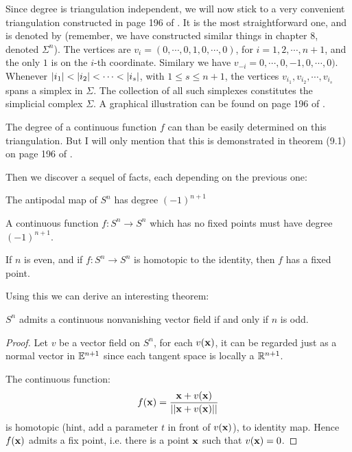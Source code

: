 Since degree is triangulation independent, we will now stick to a very
convenient triangulation constructed in page 196 of \cite{book}. It is
the most straightforward one, and is denoted by \nomen{$\Sigma$}
(remember, we have constructed similar things in chapter 8, denoted
$\Sigma^n$). The vertices are $v_i=(0,\cdots,0,1,0,\cdots,0)$, for
$i=1,2,\cdots,n+1$, and the only $1$ is on the $i$-th coordinate.
Similary we have $v_{-i}=0,\cdots,0,-1,0,\cdots,0)$. Whenever
$\abs{i_1}<\abs{i_2}<\cdots<|i_s|$, with $1\leq s \leq n+1$, the
vertices $v_{i_1},v_{i_2},\cdots,v_{i_s}$ spans a simplex in $\Sigma$.
The collection of all such simplexes constitutes the simplicial
complex $\Sigma$. A graphical illustration can be found on page 196 of
\cite{book}.

The degree of a continuous function $f$ can than be easily determined
on this triangulation. But I will only mention that this is
demonstrated in theorem (9.1) on page 196 of \cite{book}.

Then we discover a sequel of facts, each depending on the previous
one:
\begin{fact}
    The antipodal map of $S^n$ has degree $(-1)^{n+1}$
\end{fact}
\begin{fact}
    A continuous function $f:S^n\to S^n$ which has no fixed points
    must have degree $(-1)^{n+1}$.
\end{fact}
\begin{fact}
    If $n$ is even, and if $f:S^n\to S^n$ is homotopic to the
    identity, then $f$ has a fixed point.
\end{fact}

Using this we can derive an interesting theorem:
\begin{thm}
    $S^n$ admits a continuous nonvanishing vector field if and only if
    $n$ is odd.
\end{thm}
\begin{proof}
    Let $v$ be a vector field on $S^n$, for each $v(\vb{x})$, it can
    be regarded just as a normal vector in $\mathbb{E}^{n+1}$ since each
    tangent space is locally a $\mathbb{R}^{n+1}$.

    The continuous function:
    $$f(\vb{x}) = \frac{\vb{x}+v(\vb{x})}{||\vb{x}+v(\vb{x})||}$$
    is homotopic (hint, add a parameter $t$ in front of $v(\vb{x})$), 
    to identity map. Hence $f(\vb{x})$ admits a fix point, i.e. there
    is a point $\vb{x}$ such that $v(\vb{x})=0$.
\end{proof}

